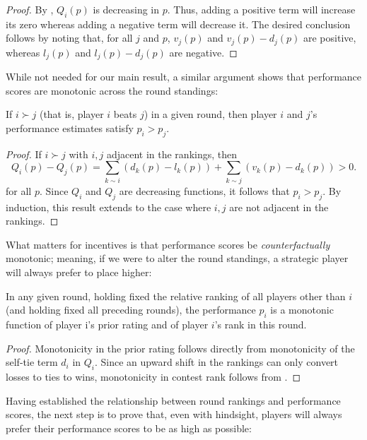 \begin{proof}
By , $Q_i(p)$ is decreasing in $p$. Thus, adding a positive term will increase its zero whereas adding a negative term will decrease it. The desired conclusion follows by noting that, for all $j$ and $p$, $v_j(p)$ and $v_j(p)-d_j(p)$ are positive, whereas $l_j(p)$ and $l_j(p)-d_j(p)$ are negative.
\end{proof}

While not needed for our main result, a similar argument shows that performance scores are monotonic across the round standings:

\begin{theorem}
If $i \succ j$ (that is, player $i$ beats $j$) in a given round, then player $i$ and $j$'s performance estimates satisfy $p_i > p_j$.
\end{theorem}

\begin{proof}
If $i \succ j$ with $i,j$ adjacent in the rankings, then
\[Q_i(p) - Q_j(p) = \sum_{k\sim i}(d_k(p) - l_k(p)) + \sum_{k\sim j}(v_k(p) - d_k(p)) > 0.\]
for all $p$. Since $Q_i$ and $Q_j$ are decreasing functions, it follows that $p_i > p_j$. By induction, this result extends to the case where $i,j$ are not adjacent in the rankings.
\end{proof}

What matters for incentives is that performance scores be \emph{counterfactually} monotonic; meaning, if we were to alter the round standings, a strategic player will always prefer to place higher:
\begin{lemma}
\label{lem:mono-perf}
In any given round, holding fixed the relative ranking of all players other than $i$ (and holding fixed all preceding rounds), the performance $p_i$ is a monotonic function of player i's prior rating and of player $i$'s rank in this round.
\end{lemma}

\begin{proof}
Monotonicity in the prior rating follows directly from monotonicity of the self-tie term $d_i$ in $Q_i$. Since an upward shift in the rankings can only convert losses to ties to wins, monotonicity in contest rank follows from . 
\end{proof}

Having established the relationship between round rankings and performance scores, the next step is to prove that, even with hindsight, players will always prefer their performance scores to be as high as possible:

